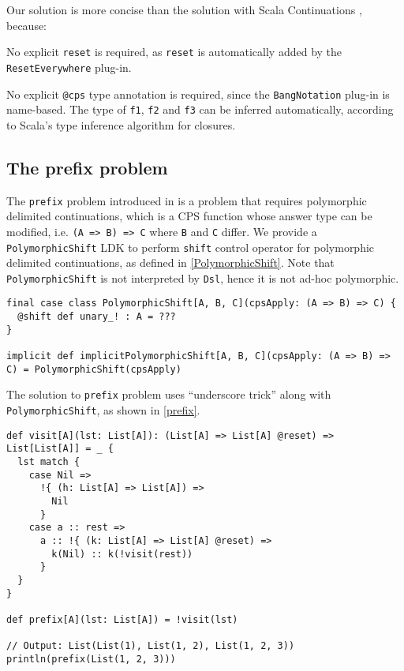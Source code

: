 Our solution is more concise than the solution with Scala Continuations \cite{rompf2009implementing}, because:
\begin{enumerate*}
  \item No explicit \lstinline{reset} is required, as \lstinline{reset} is automatically added by the \lstinline{ResetEverywhere} plug-in.
  \item No explicit \lstinline{@cps} type annotation is required, since the \lstinline{BangNotation} plug-in is name-based. The type of \lstinline{f1}, \lstinline{f2} and \lstinline{f3} can be inferred automatically, according to Scala's type inference algorithm for closures.
\end{enumerate*}

\subsection{The prefix problem}\label{The prefix problem}

The \lstinline{prefix} problem introduced in \cite{asai2007polymorphic} is a problem that requires polymorphic delimited continuations, which is a CPS function whose answer type can be modified, i.e. \lstinline{(A => B) => C} where \lstinline{B} and \lstinline{C} differ. We provide a \lstinline{PolymorphicShift} LDK to perform \lstinline{shift} control operator for polymorphic delimited continuations, as defined in \cref{PolymorphicShift}. Note that \lstinline{PolymorphicShift} is not interpreted by \lstinline{Dsl}, hence it is not ad-hoc polymorphic.

\begin{lstlisting}[caption={The definition of PolymorphicShift},label={PolymorphicShift}]
final case class PolymorphicShift[A, B, C](cpsApply: (A => B) => C) {
  @shift def unary_! : A = ???
}

implicit def implicitPolymorphicShift[A, B, C](cpsApply: (A => B) => C) = PolymorphicShift(cpsApply)  
\end{lstlisting}

The solution to \lstinline{prefix} problem uses ``underscore trick'' along with \lstinline{PolymorphicShift}, as shown in \cref{prefix}.

\begin{lstlisting}[caption={The solution to \lstinline{prefix} problem by the ``underscore trick''},label={prefix}]
def visit[A](lst: List[A]): (List[A] => List[A] @reset) => List[List[A]] = _ {
  lst match {
    case Nil =>
      !{ (h: List[A] => List[A]) =>
        Nil
      }
    case a :: rest =>
      a :: !{ (k: List[A] => List[A] @reset) =>
        k(Nil) :: k(!visit(rest))
      }
  }
}

def prefix[A](lst: List[A]) = !visit(lst)

// Output: List(List(1), List(1, 2), List(1, 2, 3))
println(prefix(List(1, 2, 3)))
\end{lstlisting}

